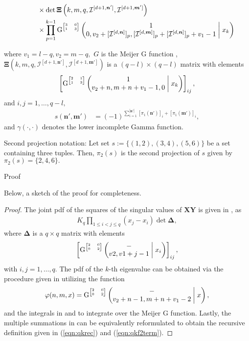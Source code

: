 \begin{theorem}
\begin{figure*}
\begin{align}
			&\qquad \times \det{\boldsymbol{\Xi}\left(k, m, q, {\mathcal{I}}^{[d+1,\boldsymbol{n}']},{\mathcal{I}}^{[d+1,\boldsymbol{m}']}\right)} \nonumber\\
			&\qquad \times \prod_{p = 1}^{k-1} \mathrm{G}^{\tiny\begin{bmatrix} 3&0\\1&3 \end{bmatrix}}\left(\begin{matrix} 1 \\ 0, v_2+[{\mathcal{I}}^{[d,\boldsymbol{n}]}]_p, [{\mathcal{I}}^{[d,\boldsymbol{m}]}]_p + [{\mathcal{I}}^{[d,\boldsymbol{n}]}]_p+v_1 - 1 \end{matrix}\;\middle|\;x_k\right)\label{eqn:qkf2term}
		\end{align}
		\hrulefill
	\end{figure*}
	where $v_1=l-q, v_2=m-q,$ $G$ is the Meijer G function \cite{Olver2010}, $\boldsymbol{\Xi}\left(k, m, q, {\mathcal{I}}^{[d+1,\boldsymbol{n}']},{\mathcal{I}}^{[d+1,\boldsymbol{m}']}\right)$ is a $(q-l)\times (q-l)$ matrix with elements 
	\begin{equation}
		\left[\mathrm{G}^{\tiny\begin{bmatrix} 2&1\\1&3 \end{bmatrix}}\left(\begin{matrix} 1 \\ v_2+n,m+n+v_1-1,0 \end{matrix}\;\middle|\;x_k\right)\right]_{ij}, \label{eqn:qkf2mat}
	\end{equation}
	and $i,j=1,\dots,q-l,$
	\begin{align}
		s\left(\boldsymbol{n}',\boldsymbol{m}'\right) &= (-1)^{\sum_{i=1}^{|\boldsymbol{n}'|} [\pi_1(\boldsymbol{n}')]_i + [\pi_1(\boldsymbol{m}')]_i},
	\end{align}
	and $\gamma(\cdot,\cdot)$ denotes the lower incomplete Gamma function.
\end{theorem}

Second projection notation: Let set $s := \{(1,2), (3,4), (5,6)\}$ be a set containing three tuples. Then, $\pi_2(s)$ is the second projection of $s$ given by $\pi_2(s) = \{2, 4, 6\}.$

Proof

Below, a sketch of the proof for completeness.

\begin{proof}
	The joint pdf of the squares of the singular values of $\boldsymbol{X}\boldsymbol{Y}$ is given in \cite[(18)]{Akemann2013},\cite{Ipsen2015} as
	\begin{align}
		K_q \prod_{1\leq i < j \leq q} (x_j-x_i) \det{\boldsymbol{\Delta}},
	\end{align}
	where $\boldsymbol{\Delta}$ is a $q \times q$ matrix with elements
	\begin{equation}
		\left[\mathrm{G}^{\tiny\begin{bmatrix} 2&0\\0&2 \end{bmatrix}}\left(\begin{matrix} - \\ v2,v1+j-1 \end{matrix}\;\middle|\;x_i\right)\right]_{ij},
	\end{equation}
	with $i,j=1,\dots,q.$ The pdf of the $k$-th eigenvalue can be obtained via the procedure given in \cite[Sec. IV-B]{Zanella2009} utilizing the function
	\begin{equation}
		\varphi(n,m,x) = \mathrm{G}^{\tiny\begin{bmatrix} 2&0\\0&2 \end{bmatrix}}\left(\begin{matrix} - \\ v_2+n-1, m+n+v_1-2 \end{matrix}\;\middle|\;x\right),
	\end{equation}
	and the integrals in \cite[(A7)]{Akemann2013} and \cite{Olver2010} to integrate over the Meijer G function. Lastly, the multiple summations in \cite[Sec. IV-B]{Zanella2009} can be equivalently reformulated to obtain the recursive definition given in (\ref{eqn:qkrec}) and (\ref{eqn:qkf2term}).
\end{proof}

